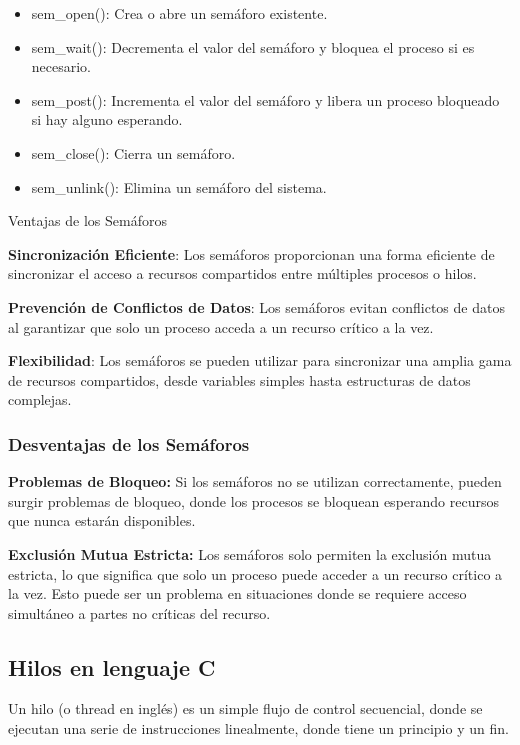 \begin{itemize} \item   sem\_open(): Crea o abre un semáforo existente. \item   sem\_wait(): Decrementa el valor del semáforo y bloquea el proceso si   es necesario. \item   sem\_post(): Incrementa el valor del semáforo y libera un proceso   bloqueado si hay alguno esperando. \item   sem\_close(): Cierra un semáforo. \item   sem\_unlink(): Elimina un semáforo del sistema. \end{itemize}

Ventajas de los Semáforos

\textbf{Sincronización Eficiente}: Los semáforos proporcionan una forma eficiente de sincronizar el acceso a recursos compartidos entre múltiples procesos o hilos.

\textbf{Prevención de Conflictos de Datos}: Los semáforos evitan conflictos de datos al garantizar que solo un proceso acceda a un recurso crítico a la vez.

\textbf{Flexibilidad}: Los semáforos se pueden utilizar para sincronizar una amplia gama de recursos compartidos, desde variables simples hasta estructuras de datos complejas.

\subsubsection{Desventajas de los Semáforos}

\textbf{Problemas de Bloqueo:} Si los semáforos no se utilizan correctamente, pueden surgir problemas de bloqueo, donde los procesos se bloquean esperando recursos que nunca estarán disponibles.

\textbf{Exclusión Mutua Estricta:} Los semáforos solo permiten la exclusión mutua estricta, lo que significa que solo un proceso puede acceder a un recurso crítico a la vez. Esto puede ser un problema en situaciones donde se requiere acceso simultáneo a partes no críticas del recurso.

\subsection{Hilos en lenguaje C}

Un hilo (o thread en inglés) es un simple flujo de control secuencial, donde se ejecutan una serie de instrucciones linealmente, donde tiene un principio y un fin.

